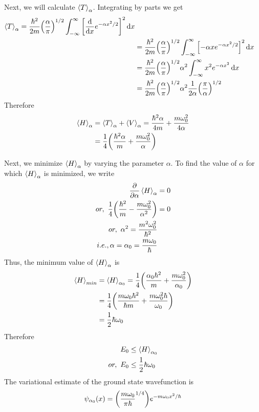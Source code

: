 	Next, we will calculate $\expval{T}_\alpha$. Integrating by parts we get
	\begin{align*}
		\expval{T}_{\alpha} =  \frac{\hbar^2}{2 m} \qty(\frac{\alpha}{\pi})^{1/2} \int_{-\infty}^{\infty} \qty[\dv{}{x} e^{-\alpha x^2 / 2}]^2 \dd{x} \\
		&=  \frac{\hbar^2}{2 m} \qty(\frac{\alpha}{\pi})^{1/2} \int_{-\infty}^{\infty} \qty[-\alpha x e^{-\alpha x^2 / 2}]^2 \dd{x} \\
		&= \frac{\hbar^2}{2 m} \qty(\frac{\alpha}{\pi})^{1/2} \alpha^2 \int_{-\infty}^{\infty} x^2 e^{-\alpha x^2} \dd{x} \\
		&= \frac{\hbar^2}{2 m} \qty(\frac{\alpha}{\pi})^{1/2} \alpha^2 \frac{1}{2 \alpha} \qty(\frac{\pi}{\alpha})^{1/2}
	\end{align*}
	Therefore
	\begin{align*}
		\expval{H}_\alpha &= \expval{T}_\alpha + \expval{V}_\alpha = \frac{\hbar^2 \alpha}{4 m} + \frac{m \omega_0^2}{4 \alpha}\\
		&= \frac{1}{4} \qty(\frac{\hbar^2 \alpha}{m}  +  \frac{m \omega_0^2}{\alpha})
	\end{align*}
	
	Next, we minimize $\expval{H}_\alpha$ by varying the parameter $\alpha$. To find the value of $\alpha$ for which $\expval{H}_\alpha$ is minimized, we write
	\begin{align*}
		\pdv{}{\alpha} \expval{H}_\alpha &= 0\\
		or, \ \frac{1}{4} \qty(\frac{\hbar^2}{m} - \frac{m \omega_0^2}{\alpha^2}) &= 0\\
		or, \ \alpha^2 = \frac{m^2 \omega_0^2}{\hbar^2} \\
		i.e., \alpha = \alpha_0 = \frac{m \omega_0}{\hbar}
	\end{align*}
	Thus, the minimum value of $\expval{H}_\alpha$ is 
	\begin{align*}
	 \expval{H}_{min}
	 &= \expval{H}_{\alpha_0} = \frac{1}{4} \qty(\frac{\alpha_0 \hbar^2}{m}   +  \frac{m \omega_0^2}{\alpha_0} ) \\
	 &= \frac{1}{4} \qty(\frac{m \omega_0 \hbar^2}{\hbar m}  +  \frac{m \omega_0^2 \hbar}{\omega_0})  \\
	 &= \frac{1}{2} \hbar \omega_0
	\end{align*}
	Therefore
	\begin{align*}
		E_0 &\leq \expval{H}_{\alpha_0}\\
or, \	E_0 &\leq \frac{1}{2} \hbar \omega_0
	\end{align*}
	The variational estimate of the ground state wavefunction is
	\begin{align*}
		\psi_{\alpha_0} \qty(x) = \qty(\frac{m \omega_0}{\pi \hbar}^{1/4}) e^{-m\omega_0 x^2/ \hbar}
	\end{align*}
	
